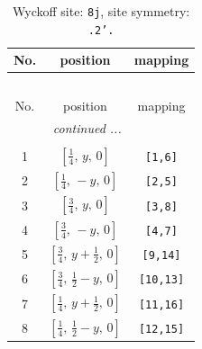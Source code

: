 \documentclass[fleqn,8pt]{jsarticle}
\begin{document}
\begin{longtable}{ccc}
\caption{Wyckoff site: {\tt 8j}, site symmetry: {\tt .2'.}}
 \\
 \hline \hline
No. & position & mapping \\ \hline \endfirsthead

\multicolumn{2}{l}{\tablename\ \thetable{}} \\
 \hline \hline
No. & position & mapping \\ \hline \endhead

 \hline \hline
\multicolumn{2}{r}{\footnotesize\it continued ...} \\ \endfoot

 \hline \hline
\multicolumn{2}{r}{} \\ \endlastfoot

1 & $\left[ \frac{1}{4},\, y,\, 0 \right]$ & {\tt [1,6]} \\ \hline
2 & $\left[ \frac{1}{4},\, - y,\, 0 \right]$ & {\tt [2,5]} \\ \hline
3 & $\left[ \frac{3}{4},\, y,\, 0 \right]$ & {\tt [3,8]} \\ \hline
4 & $\left[ \frac{3}{4},\, - y,\, 0 \right]$ & {\tt [4,7]} \\ \hline
5 & $\left[ \frac{3}{4},\, y + \frac{1}{2},\, 0 \right]$ & {\tt [9,14]} \\ \hline
6 & $\left[ \frac{3}{4},\, \frac{1}{2} - y,\, 0 \right]$ & {\tt [10,13]} \\ \hline
7 & $\left[ \frac{1}{4},\, y + \frac{1}{2},\, 0 \right]$ & {\tt [11,16]} \\ \hline
8 & $\left[ \frac{1}{4},\, \frac{1}{2} - y,\, 0 \right]$ & {\tt [12,15]} \\
\end{longtable}
\renewcommand{\arraystretch}{1.2}
\end{document}
